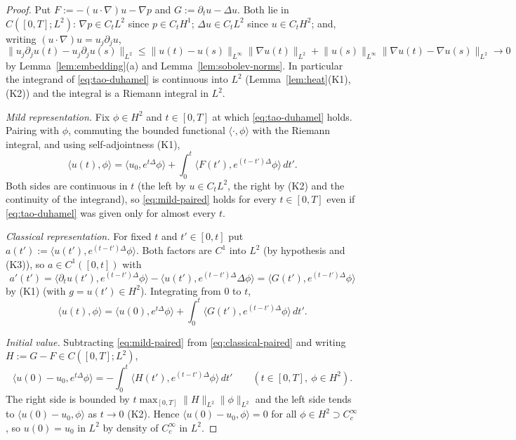 \documentclass[11pt]{article}
\theoremstyle{definition}
\theoremstyle{plain}
\newcommand{\norm}[1]{\lVert #1\rVert}
\begin{document}
\begin{proof}
Put $F:=-(u\cdot\nabla)u-\nabla p$ and $G:=\partial_tu-\Delta u$.  Both
lie in $C([0,T];L^2)$: $\nabla p\in C_tL^2$ since $p\in C_tH^1$;
$\Delta u\in C_tL^2$ since $u\in C_tH^2$; and, writing
$(u\cdot\nabla)u=u_j\partial_ju$,
\[
 \norm{u_j\partial_ju(t)-u_j\partial_ju(s)}_{L^2}\leq
 \norm{u(t)-u(s)}_{L^\infty}\norm{\nabla u(t)}_{L^2}
 +\norm{u(s)}_{L^\infty}\norm{\nabla u(t)-\nabla u(s)}_{L^2}\to0
\]
by Lemma~\ref{lem:embedding}(a) and Lemma~\ref{lem:sobolev-norms}.  In
particular the integrand of \eqref{eq:tao-duhamel} is continuous into
$L^2$ (Lemma~\ref{lem:heat}(K1),(K2)) and the integral is a Riemann
integral in $L^2$.

\emph{Mild representation.}  Fix $\phi\in H^2$ and $t\in[0,T]$ at which
\eqref{eq:tao-duhamel} holds.  Pairing with $\phi$, commuting the bounded
functional $\langle\cdot,\phi\rangle$ with the Riemann integral, and using
self-adjointness (K1),
\begin{equation}\label{eq:mild-paired}
 \langle u(t),\phi\rangle=\langle u_0,e^{t\Delta}\phi\rangle
 +\int_0^t\langle F(t'),e^{(t-t')\Delta}\phi\rangle\,dt' .
\end{equation}
Both sides are continuous in $t$ (the left by $u\in C_tL^2$, the right by
(K2) and the continuity of the integrand), so \eqref{eq:mild-paired} holds
for every $t\in[0,T]$ even if \eqref{eq:tao-duhamel} was given only for
almost every $t$.

\emph{Classical representation.}  For fixed $t$ and $t'\in[0,t]$ put
$a(t'):=\langle u(t'),e^{(t-t')\Delta}\phi\rangle$.  Both factors are
$C^1$ into $L^2$ (by hypothesis and (K3)), so $a\in C^1([0,t])$ with
\[
 a'(t')=\langle\partial_tu(t'),e^{(t-t')\Delta}\phi\rangle
 -\langle u(t'),e^{(t-t')\Delta}\Delta\phi\rangle
 =\langle G(t'),e^{(t-t')\Delta}\phi\rangle
\]
by (K1) (with $g=u(t')\in H^2$).  Integrating from $0$ to $t$,
\begin{equation}\label{eq:classical-paired}
 \langle u(t),\phi\rangle=\langle u(0),e^{t\Delta}\phi\rangle
 +\int_0^t\langle G(t'),e^{(t-t')\Delta}\phi\rangle\,dt' .
\end{equation}

\emph{Initial value.}  Subtracting \eqref{eq:mild-paired} from
\eqref{eq:classical-paired} and writing $H:=G-F\in C([0,T];L^2)$,
\begin{equation}\label{eq:difference}
 \langle u(0)-u_0,e^{t\Delta}\phi\rangle
 =-\int_0^t\langle H(t'),e^{(t-t')\Delta}\phi\rangle\,dt'
 \qquad(t\in[0,T],\ \phi\in H^2).
\end{equation}
The right side is bounded by $t\max_{[0,T]}\norm H_{L^2}\norm\phi_{L^2}$
and the left side tends to $\langle u(0)-u_0,\phi\rangle$ as $t\to0$
(K2).  Hence $\langle u(0)-u_0,\phi\rangle=0$ for all $\phi\in H^2\supset
C_c^\infty$, so $u(0)=u_0$ in $L^2$ by density of $C_c^\infty$ in $L^2$.


\end{proof}
\end{document}

